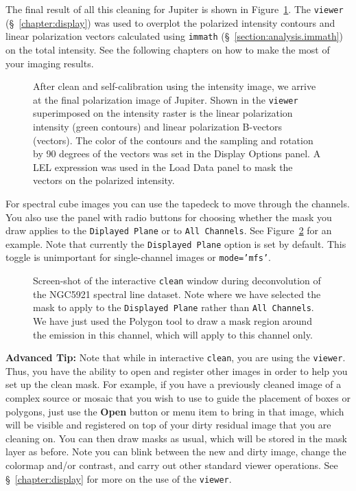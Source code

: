 The final result of all this cleaning for Jupiter is shown in
Figure~\ref{fig:clean_polfinal}.  The {\tt viewer} 
(\S~\ref{chapter:display}) was used to overplot the polarized
intensity contours and linear polarization vectors calculated using
{\tt immath} (\S~\ref{section:analysis.immath}) on the total
intensity.  See the following chapters on how to make the most of
your imaging results.

\begin{figure}[h!]
\begin{center}
\caption{\label{fig:clean_polfinal} 
After clean and self-calibration using the intensity image, we 
arrive at the final polarization image of Jupiter.  Shown in
the {\tt viewer} superimposed on the intensity raster is the
linear polarization intensity (green contours) and linear polarization
B-vectors (vectors).  The color of the contours and the sampling and
rotation by 90 degrees of the vectors was set in the Display Options
panel.  A LEL expression was used in the Load Data panel to mask the
vectors on the polarized intensity.}
\hrulefill
\end{center}
\end{figure}

For spectral cube images you can use the tapedeck to move through the
channels.  You also use the panel with radio buttons for choosing
whether the mask you draw applies to the
{\tt Diplayed Plane} or to {\tt All Channels}.
See Figure~\ref{fig:clean_n5921_inter} for an example.  Note that
currently the {\tt Displayed Plane} option is set by default.  
This toggle is unimportant for single-channel images or {\tt mode='mfs'}.

\begin{figure}[h!]
\begin{center}
\caption{\label{fig:clean_n5921_inter} Screen-shot of the interactive 
{\tt clean} window during deconvolution of the NGC5921 spectral
line dataset.  Note where we have selected
the mask to apply to the {\tt Displayed Plane} rather than
{\tt All Channels}.  We have just used the
Polygon tool to draw a mask region around the emission in this
channel, which will apply to this channel only. } 
\hrulefill
\end{center}
\end{figure}

{\bf Advanced Tip:} Note that while in interactive {\tt clean}, you
are using the {\tt viewer}. Thus, you have the ability to open and
register other images in order to help you set up the clean mask.
For example, if you have a previously cleaned image of a complex
source or mosaic that you wish to use to guide the placement of boxes
or polygons, just use the {\bf Open} button or menu item to bring in
that image, which will be visible and registered on top of your dirty
residual image that you are cleaning on.  You can then draw masks as
usual, which will be stored in the mask layer as before.  Note you can
blink between the new and dirty image, change the colormap and/or
contrast, and carry out other standard viewer operations.  See
\S~\ref{chapter:display} for more on the use of the {\tt viewer}.

